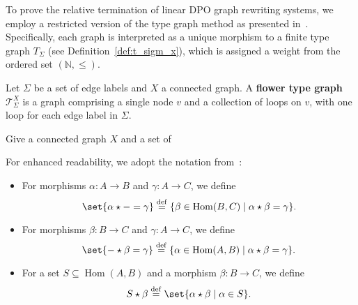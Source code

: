 To prove the relative termination of linear DPO graph rewriting systems, we employ a restricted version of the type graph method as presented in~\cite{endrullis2023generalized}. Specifically, each graph is interpreted as a unique morphism to a finite type graph \( T_\Sigma \) (see Definition~\ref{def:t_sigm_x}), which is assigned a weight from the ordered set \((\mathbb{N}, \leq)\).

\begin{definition}
    \label{def:t_sigm_x}
    Let $\Sigma$ be a set of edge labels and \( X \) a connected graph.
    A \textbf{flower type graph} \( \mathcal{T}_\Sigma^X \) is a graph comprising a single node \( v \) and a collection of loops on \( v \), with one loop for each edge label in \( \Sigma \).
\end{definition}
Give a connected graph $X$ and a set of 

\begin{remark}[Notation]
    For enhanced readability, we adopt the notation from~\cite[Notation 3.3]{endrullis2023generalized}:
    \begin{itemize}
        \item For morphisms \( \alpha : A \to B \) and \( \gamma : A \to C \), we define
        \[
            \set{ \alpha \star - = \gamma } \overset{\operatorname{def}}{=} \{ \beta \in \operatorname{Hom}(B, C) \mid \alpha \star \beta = \gamma \}.
        \]
        \item For morphisms \( \beta : B \to C \) and \( \gamma : A \to C \), we define
        \[
            \set{ - \star \beta = \gamma } \overset{\operatorname{def}}{=} \{ \alpha \in \operatorname{Hom}(A, B) \mid \alpha \star \beta = \gamma \}.
        \]
        \item For a set \( S \subseteq \operatorname{Hom}(A, B) \) and a morphism \( \beta : B \to C \), we define
        \[
            S \star \beta \overset{\operatorname{def}}{=} \set{ \alpha \star \beta \mid \alpha \in S }.
        \]
    \end{itemize}
\end{remark}

